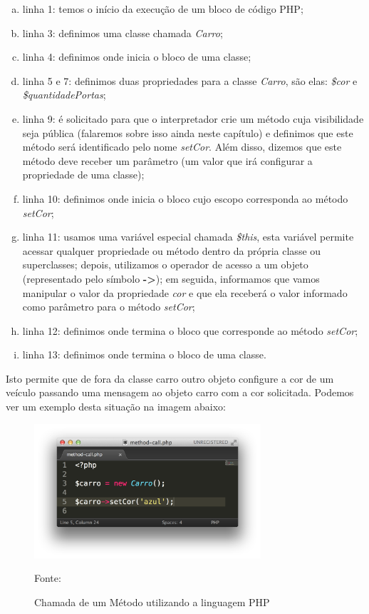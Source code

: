 \begin{enumerate}[a)]
    \item linha 1: temos o início da execução de um bloco de código PHP;
    \item linha 3: definimos uma classe chamada \textit{Carro};
    \item linha 4: definimos onde inicia o bloco de uma classe;
    \item linha 5 e 7: definimos duas propriedades para a classe
    \textit{Carro}, são elas: \textit{\$cor} e \textit{\$quantidadePortas};
    \item linha 9: é solicitado para que o interpretador crie um método
    cuja visibilidade seja pública (falaremos sobre isso ainda neste capítulo)
    e definimos que este método será identificado pelo nome \textit{setCor}.
    Além disso, dizemos que este método deve receber um parâmetro (um valor
    que  irá configurar a propriedade de uma classe);
    \item linha 10: definimos onde inicia o bloco cujo escopo
    corresponda ao método \textit{setCor};
    \item linha 11: usamos uma variável especial chamada
    \textit{\$this}, esta variável permite acessar qualquer propriedade ou
    método dentro da própria classe ou superclasses; depois, utilizamos o
    operador de acesso a um objeto (representado pelo símbolo \textbf{->}); em
    seguida, informamos que vamos manipular o valor da propriedade \textit{cor}
    e que ela receberá o valor informado como parâmetro para o método \textit{setCor};
    \item linha 12: definimos onde termina o bloco que corresponde ao
    método \textit{setCor};
    \item linha 13: definimos onde termina o bloco de uma classe.
\end{enumerate}

Isto permite que de fora da classe carro outro objeto configure a cor de um
veículo passando uma mensagem ao objeto carro com a cor solicitada. Podemos ver
um exemplo desta situação na imagem abaixo:


\begin{figure}[h!tb]
	\caption{Chamada de um Método utilizando a linguagem PHP}
	\label{fig:chamadaMetodo}

	\centering
	\includegraphics[width=0.75\textwidth]{images/method-call.png}

	\centering
	\footnotesize Fonte: \fonteOAutor
\end{figure}

